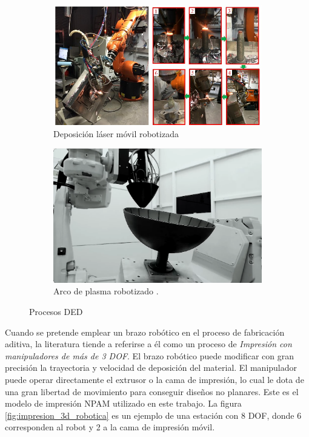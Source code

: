 \begin{itemize}
    \begin{figure}[h!]
        \centering
         \begin{subfigure}[h]{0.45\linewidth} 
            \centering
            \includegraphics[scale=0.35]{figuras/ejemplo_ding_2016.jpg}
            \caption{Deposición láser móvil robotizada \cite{Ding_2016}}
            \label{fig:ejemplo_ding_2016}
        \end{subfigure}
        \begin{subfigure}[h]{0.45\linewidth} 
            \centering
            \includegraphics[scale=0.45]{figuras/ejemplo_meltio.png}
            \caption{Arco de plasma robotizado \cite{Meltio_web}.}
            \label{fig:ejemplo_meltio}
        \end{subfigure}
        \caption{Procesos \acrshort{DED}}
    \end{figure}

    
\end{itemize}
 
Cuando se pretende emplear un brazo robótico en el proceso de fabricación aditiva, la literatura tiende a referirse a él como un proceso de \textit{Impresión con manipuladores de más de 3 \acrshort{DOF}}. El brazo robótico puede modificar con gran precisión la trayectoria y velocidad de deposición del material. El manipulador puede operar directamente el extrusor o la cama de impresión, lo cual le dota de una gran libertad de movimiento para conseguir diseños no planares. Este es el modelo de impresión \acrshort{NPAM} utilizado en este trabajo. La figura \ref{fig:impresion_3d_robotica} es un ejemplo de una estación con 8 \acrshort{DOF}, donde 6 corresponden al robot y 2 a la cama de impresión móvil.

